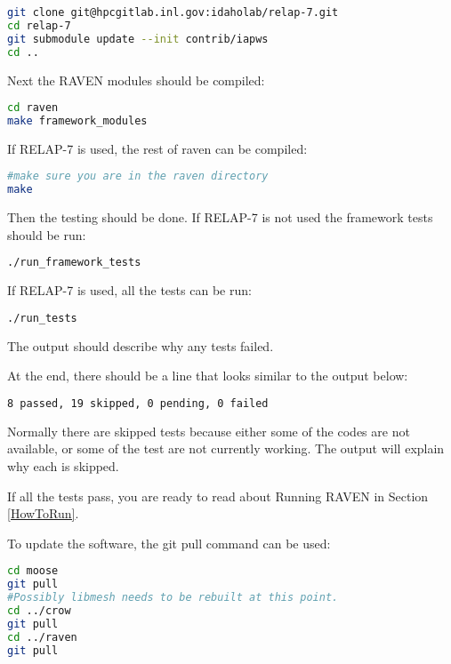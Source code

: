 \begin{lstlisting}[language=bash]
git clone git@hpcgitlab.inl.gov:idaholab/relap-7.git
cd relap-7
git submodule update --init contrib/iapws
cd ..
\end{lstlisting}

Next the RAVEN modules should be compiled:

\begin{lstlisting}[language=bash]
cd raven
make framework_modules
\end{lstlisting}

If RELAP-7 is used, the rest of raven can be compiled:

\begin{lstlisting}[language=bash]
#make sure you are in the raven directory
make
\end{lstlisting}


Then the testing should be done.  If RELAP-7 is not used the framework
tests should be run:

\begin{lstlisting}[language=bash]
./run_framework_tests
\end{lstlisting}

If RELAP-7 is used, all the tests can be run:

\begin{lstlisting}[language=bash]
./run_tests
\end{lstlisting}


The output should describe why any tests failed.

At the end, there should be a line that looks similar to the output below:
\begin{lstlisting}[language=bash]
8 passed, 19 skipped, 0 pending, 0 failed
\end{lstlisting}

Normally there are skipped tests because either some of the codes are
not available, or some of the test are not currently working.  The
output will explain why each is skipped.

If all the tests pass, you are ready to read about Running RAVEN in
Section \ref{HowToRun}.

To update the software, the git pull command can be used:

\begin{lstlisting}[language=bash]
cd moose
git pull
#Possibly libmesh needs to be rebuilt at this point.
cd ../crow
git pull
cd ../raven
git pull
\end{lstlisting}

